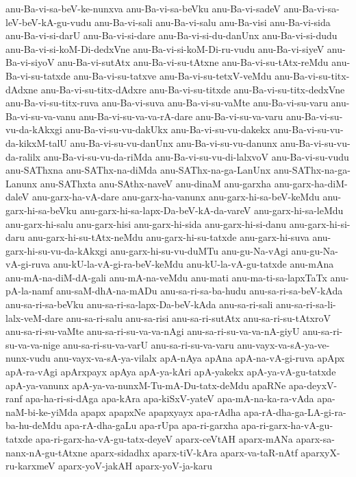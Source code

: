 {anu-Ba-vi-sa-beV-ke-nunxva
anu-Ba-vi-sa-beVku
anu-Ba-vi-sadeV
anu-Ba-vi-sa-leV-beV-kA-gu-vudu
anu-Ba-vi-sali
anu-Ba-vi-salu
anu-Ba-visi
anu-Ba-vi-sida
anu-Ba-vi-si-darU
anu-Ba-vi-si-dare
anu-Ba-vi-si-du-danUnx
anu-Ba-vi-si-dudu
anu-Ba-vi-si-koM-Di-dedxVne
anu-Ba-vi-si-koM-Di-ru-vudu
anu-Ba-vi-siyeV
anu-Ba-vi-siyoV
anu-Ba-vi-sutAtx
anu-Ba-vi-su-tAtxne
anu-Ba-vi-su-tAtx-reMdu
anu-Ba-vi-su-tatxde
anu-Ba-vi-su-tatxve
anu-Ba-vi-su-tetxV-veMdu
anu-Ba-vi-su-titx-dAdxne
anu-Ba-vi-su-titx-dAdxre
anu-Ba-vi-su-titxde
anu-Ba-vi-su-titx-dedxVne
anu-Ba-vi-su-titx-ruva
anu-Ba-vi-suva
anu-Ba-vi-su-vaMte
anu-Ba-vi-su-varu
anu-Ba-vi-su-va-vanu
anu-Ba-vi-su-va-va-rA-dare
anu-Ba-vi-su-va-varu
anu-Ba-vi-su-vu-da-kAkxgi
anu-Ba-vi-su-vu-dakUkx
anu-Ba-vi-su-vu-dakekx
anu-Ba-vi-su-vu-da-kikxM-talU
anu-Ba-vi-su-vu-danUnx
anu-Ba-vi-su-vu-danunx
anu-Ba-vi-su-vu-da-ralilx
anu-Ba-vi-su-vu-da-riMda
anu-Ba-vi-su-vu-di-lalxvoV
anu-Ba-vi-su-vudu
anu-SAThxna
anu-SAThx-na-diMda
anu-SAThx-na-ga-LanUnx
anu-SAThx-na-ga-Lanunx
anu-SAThxta
anu-SAthx-naveV
anu-dinaM
anu-garxha
anu-garx-ha-diM-daleV
anu-garx-ha-vA-dare
anu-garx-ha-vanunx
anu-garx-hi-sa-beV-keMdu
anu-garx-hi-sa-beVku
anu-garx-hi-sa-lapx-Da-beV-kA-da-vareV
anu-garx-hi-sa-leMdu
anu-garx-hi-salu
anu-garx-hisi
anu-garx-hi-sida
anu-garx-hi-si-danu
anu-garx-hi-si-daru
anu-garx-hi-su-tAtx-neMdu
anu-garx-hi-su-tatxde
anu-garx-hi-suva
anu-garx-hi-su-vu-da-kAkxgi
anu-garx-hi-su-vu-duMTu
anu-gu-Na-vAgi
anu-gu-Na-vA-gi-ruva
anu-kU-la-vA-gi-ra-beV-keMdu
anu-kU-la-vA-gu-tatxde
anu-mAna
anu-mA-na-diM-dA-gali
anu-mA-na-veMdu
anu-mati
anu-ma-ti-sa-lapxTaTx
anu-pA-la-namf
anu-saM-dhA-na-mADu
anu-sa-ri-sa-ba-hudu
anu-sa-ri-sa-beV-kAda
anu-sa-ri-sa-beVku
anu-sa-ri-sa-lapx-Da-beV-kAda
anu-sa-ri-sali
anu-sa-ri-sa-li-lalx-veM-dare
anu-sa-ri-salu
anu-sa-risi
anu-sa-ri-sutAtx
anu-sa-ri-su-tAtxroV
anu-sa-ri-su-vaMte
anu-sa-ri-su-va-va-nAgi
anu-sa-ri-su-va-va-nA-giyU
anu-sa-ri-su-va-va-nige
anu-sa-ri-su-va-varU
anu-sa-ri-su-va-varu
anu-vayx-va-sA-ya-ve-nunx-vudu
anu-vayx-va-sA-ya-vilalx
apA-nAya
apAna
apA-na-vA-gi-ruva
apApx
apA-ra-vAgi
apArxpayx
apAya
apA-ya-kAri
apA-yakekx
apA-ya-vA-gu-tatxde
apA-ya-vanunx
apA-ya-va-nunxM-Tu-mA-Du-tatx-deMdu
apaRNe
apa-deyxV-ranf
apa-ha-ri-si-dAga
apa-kAra
apa-kiSxV-yateV
apa-mA-na-ka-ra-vAda
apa-naM-bi-ke-yiMda
apapx
apapxNe
apapxyayx
apa-rAdha
apa-rA-dha-ga-LA-gi-ra-ba-hu-deMdu
apa-rA-dha-gaLu
apa-rUpa
apa-ri-garxha
apa-ri-garx-ha-vA-gu-tatxde
apa-ri-garx-ha-vA-gu-tatx-deyeV
aparx-ceVtAH
aparx-mANa
aparx-sa-nanx-nA-gu-tAtxne
aparx-sidadhx
aparx-tiV-kAra
aparx-va-taR-nAtf
aparxyX-ru-karxmeV
aparx-yoV-jakAH
aparx-yoV-ja-karu
}
